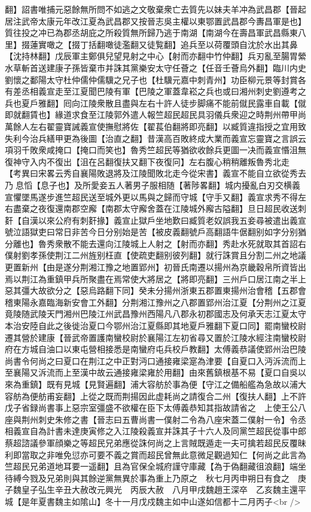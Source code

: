 翻】詔書唯捕元惡餘無所問不如逃之文敬棄衆亡去質先以妹夫羊冲為武昌郡【晉起居注武帝太康元年改江夏為武昌郡又按晉志吳主權以東鄂置武昌郡今夀昌軍是也】質往投之冲已為郡丞胡庇之所殺質無所歸乃逃于南湖【南湖今在壽昌軍武昌縣東八里】掇蓮實噉之【掇丁括翻噉徒濫翻又徒覧翻】追兵至以荷覆頭自沈於水出其鼻【沈持林翻】戊辰軍主鄭俱兒望見射之中心【射而亦翻中竹仲翻】兵刃亂至腸胃縈水草斬首送建康子孫皆棄市并誅其黨樂安太守任薈之【任音壬薈烏外翻】臨川内史劉懷之鄱陽太守杜仲儒仲儒驥之兄子也【杜驥元嘉中刺青州】功臣柳元景等封賞各有差丞相義宣走至江夏聞巴陵有軍【巴陵之軍蓋韋崧之兵也或曰湘州刺史劉遵考之兵也夏戶雅翻】囘向江陵衆散且盡與左右十許人徒步脚痛不能前僦民露車自載【僦即就翻賃也】緣道求食至江陵郭外遣人報竺超民超民具羽儀兵衆迎之時荆州帶甲尚萬餘人左右翟靈寶誡義宣使撫慰將佐【翟萇伯翻將即亮翻】以臧質違指授之宜用致失利今治兵繕甲更為後圖【治直之翻】昔漢高百敗終成大業而義宣忘靈寶之言誤云項羽千敗衆咸掩口【掩口而笑也】魯秀竺超民等猶欲收餘兵更圖一决而義宣惽沮無復神守入内不復出【沮在呂翻復扶又翻下夜復冋】左右腹心稍稍離叛魯秀北走　【考異曰宋畧云秀自襄陽敗退將及江陵聞敗北走今從宋書】義宣不能自立欲從秀去乃息慆【息子也】及所愛妾五人著男子服相随【著陟畧翻】城内擾亂白刃交横義宣懼墜馬遂步進竺超民送至城外更以馬與之歸而守城【守手又翻】義宣求秀不得左右盡棄之夜復還南郡空廨【南郡太守廨舍蓋在江陵城外廨古隘翻】旦日超民收送刺姧【自漢以來公府有刺姧掾】義宣止獄戶坐地歎曰臧質老奴誤我五妾尋被遣出義宣號泣語獄吏曰常日非苦今日分别始是苦【被皮義翻號戶高翻語牛倨翻别如字分别猶分離也】魯秀衆散不能去還向江陵城上人射之【射而亦翻】秀赴水死就取其首詔右僕射劉孝孫使荆江二州旌别枉直【使疏吏翻别彼列翻】就行誅賞且分割二州之地議更置新州【由是遂分荆湘江豫之地置郢州】初晉氏南遷以揚州為京畿穀帛所資皆出焉以荆江為重鎮甲兵所聚盡在焉常使大將居之【將即亮翻】三州戶口居江南之半上惡其彊大故欲分之【惡烏路翻下同】癸未分揚州浙東五郡置東揚州治會稽【五郡會稽東陽永嘉臨海新安會工外翻】分荆湘江豫州之八郡置郢州治江夏【分荆州之江夏竟陵随武陵天門湘州巴陵江州武昌豫州西陽凡八郡永初郡國志及何承天志江夏太守本治安陸自此之後徙治夏口今鄂州治江夏縣即其地夏戶雅翻下夏口同】罷南蠻校尉遷其營於建康【晉武帝置護南蠻校尉於襄陽江左初省尋又置於江陵水經注南蠻校尉府在方城自油口以東屯營相接悉是南蠻府屯兵校戶教翻】太傅義恭議使郢州治巴陵尚書令何尚之曰夏口在荆江之中正對沔口通接雍梁寔為津要【自夏口入沔泝流而上至襄陽又泝流而上至漢中故云通接雍梁雍於用翻】由來舊鎮根基不易【夏口自吳以來為重鎮】既有見城【見賢遍翻】浦大容舫於事為便【守江之備船艦為急故以浦大容舫為便舫甫妄翻】上從之既而荆揚因此虚耗尚之請復合二州【復扶人翻】上不許　戊子省録尚書事上惡宗室彊盛不欲權在臣下太傅義恭知其指故請省之　上使王公八座與荆州刺史朱修之書【晉志曰五曹尚書一僕射二令為八座宋蓋二僕射一令】令丞相義宣自為計書未達庚寅修之入江陵殺義宣并誅其子十六人及同黨竺超民從事中郎蔡超諮議參軍顔樂之等超民兄弟應從誅何尚之上言賊既遁走一夫可擒若超民反覆昧利即當取之非唯免愆亦可要不義之賞而超民曾無此意微足觀過知仁【何尚之此言為竺超民兄弟道地耳要一遥翻】且為官保全城府謹守庫藏【為于偽翻藏徂浪翻】端坐待縛今戮及兄弟則與其餘逆黨無異於事為重上乃原之　秋七月丙申朔日有食之　庚子魏皇子弘生辛丑大赦改元興光　丙辰大赦　八月甲戌魏趙王深卒　乙亥魏主還平城【是年夏書魏主如隂山】冬十一月戊戍魏主如中山遂如信都十二月丙子<br />
